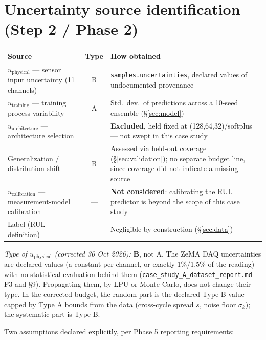\documentclass[11pt]{article}
\begin{document}
\section{Uncertainty source identification (Step 2 / Phase 2)}
\label{sec:sources}

\begin{center}
\begin{tabular}{@{}p{4.1cm}cp{7.4cm}@{}}
\toprule
Source & Type & How obtained \\
\midrule
$u_{\mathrm{physical}}$ --- sensor input uncertainty (11 channels) & B & \texttt{samples.uncertainties}, declared values of undocumented provenance \\
$u_{\mathrm{training}}$ --- training process variability & A & Std.\ dev.\ of predictions across a 10-seed ensemble (\S\ref{sec:model}) \\
$u_{\mathrm{architecture}}$ --- architecture selection & --- & \textbf{Excluded}, held fixed at (128,64,32)/softplus --- not swept in this case study \\
Generalization / distribution shift & B & Assessed via held-out coverage (\S\ref{sec:validation}); no separate budget line, since coverage did not indicate a missing source \\
$u_{\mathrm{calibration}}$ --- measurement-model calibration & --- & \textbf{Not considered}: calibrating the RUL predictor is beyond the scope of this case study \\
Label (RUL definition) & --- & Negligible by construction (\S\ref{sec:data}) \\
\bottomrule
\end{tabular}
\end{center}

\noindent\emph{Type of $u_{\mathrm{physical}}$ (corrected 30 Oct 2026):} \textbf{B}, not A. The ZeMA DAQ uncertainties are declared values (a constant per channel, or exactly 1\%/1.5\% of the reading) with no statistical evaluation behind them (\texttt{case\_\allowbreak study\_\allowbreak A\_\allowbreak dataset\_\allowbreak report.md} F3 and \S9). Propagating them, by LPU or Monte Carlo, does not change their type. In the corrected budget, the random part is the declared Type B value capped by Type A bounds from the data (cross-cycle spread $s$, noise floor $\sigma_k$); the systematic part is Type B.

Two assumptions declared explicitly, per Phase 5 reporting requirements:
\end{document}
